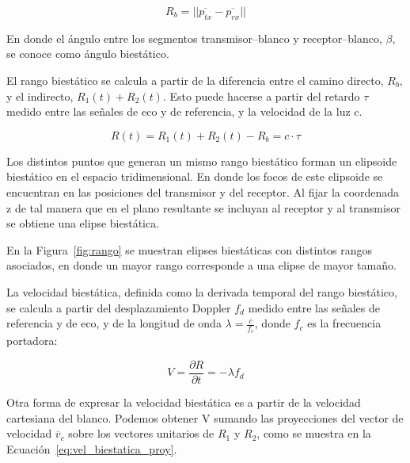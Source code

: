	\begin{equation}
		R_b = || \overline{p_{tx}} - \overline{p_{rx}} ||
	\end{equation}

	En donde el ángulo entre los segmentos transmisor–blanco y receptor–blanco,  \(\beta\), se conoce como ángulo biestático.





	El rango biestático se calcula a partir de la diferencia entre el camino directo, $R_b$, y el indirecto, $R_1(t) + R_2(t)$. Esto puede hacerse a partir del retardo \(\tau\) medido entre las señales de eco y de referencia, y la velocidad de la luz \(c\).

	\begin{equation}
		R(t) = R_1(t) + R_2(t) - R_b = c \cdot \tau
		\label{eq:rango_biestatico}
	\end{equation}

	Los distintos puntos que generan un mismo rango biestático forman un elipsoide biestático en el espacio tridimensional.  En donde los focos de este elipsoide se encuentran en las posiciones del transmisor y del receptor.
	Al fijar la coordenada z de tal manera que en el plano resultante se incluyan al receptor y al transmisor se obtiene una elipse biestática.



	En la Figura~\ref{fig:rango} se muestran elipses biestáticas con distintos rangos asociados, en donde un mayor rango corresponde a una elipse de mayor tamaño.


	La velocidad biestática, definida como la derivada temporal del rango biestático, se calcula a partir del desplazamiento Doppler \(f_{d}\) medido entre las señales de referencia y de eco, y de la longitud de onda \(\lambda = \frac{c}{f_{c}}\), donde \(f_{c}\) es la frecuencia portadora:

	\begin{equation}
		V = \dfrac{\partial R}{\partial t} = -\lambda f_d
		\label{eq:vel_biestatica}
	\end{equation}

	Otra forma de expresar la velocidad biestática es a partir de la velocidad cartesiana del blanco. Podemos obtener V sumando las proyecciones del vector de velocidad $\overline{v}_c$ sobre los vectores unitarios de $R_1$ y $R_2$, como se muestra en la Ecuación~\ref{eq:vel_biestatica_proy}.

